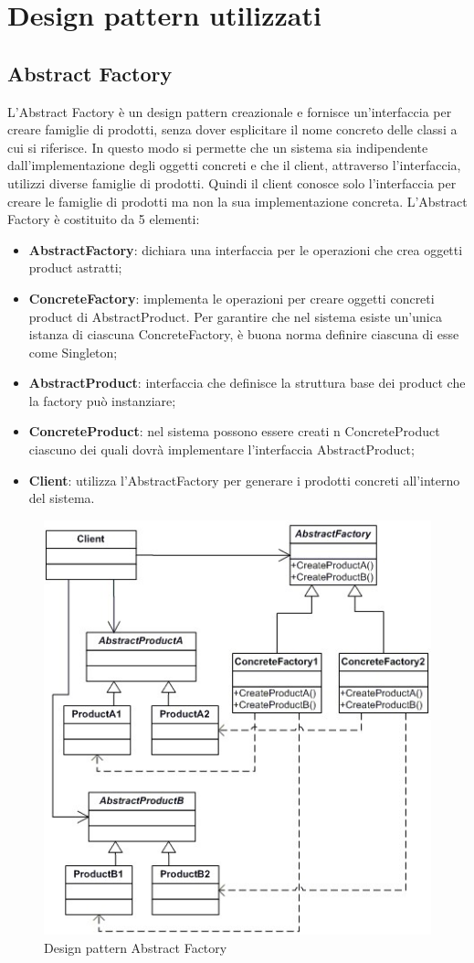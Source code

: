 \newpage
\section{Design pattern utilizzati}


\subsection{Abstract Factory}
L'Abstract Factory è un design pattern creazionale e fornisce un'interfaccia per creare famiglie di prodotti, senza dover esplicitare il nome concreto delle classi a cui si riferisce. In questo modo si permette che un sistema sia indipendente dall'implementazione degli oggetti concreti e che il client, attraverso l'interfaccia, utilizzi diverse famiglie di prodotti. Quindi il client conosce solo l’interfaccia per creare le famiglie di prodotti ma non la sua implementazione concreta.
L’Abstract Factory è costituito da 5 elementi:
\begin{itemize}
	\item \textbf{AbstractFactory}: dichiara una interfaccia per le operazioni che crea oggetti product astratti;
	\item \textbf{ConcreteFactory}: implementa le operazioni per creare oggetti concreti product di AbstractProduct. Per garantire che nel sistema esiste un’unica istanza di ciascuna ConcreteFactory, è buona norma definire ciascuna di esse come Singleton;
	\item \textbf{AbstractProduct}: interfaccia che definisce la struttura base dei product che la factory può instanziare;
	\item \textbf{ConcreteProduct}: nel sistema possono essere creati n ConcreteProduct ciascuno dei quali dovrà implementare l’interfaccia AbstractProduct;
	\item \textbf{Client}: utilizza l’AbstractFactory per generare i prodotti concreti all’interno del sistema.
\end{itemize}

\begin{figure}[H]
	\centering
	\includegraphics[width=0.5\linewidth]{IMG/abstract-pattern}
	\caption{Design pattern Abstract Factory}
	\label{fig:abstract-pattern}
\end{figure}


